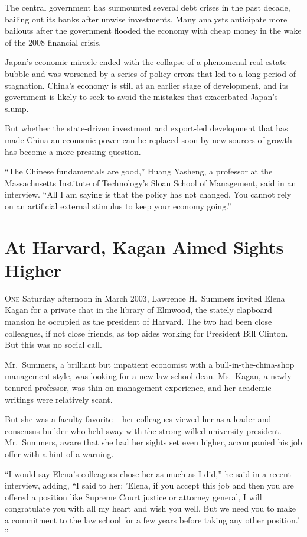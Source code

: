 ﻿\documentclass[12pt]{article}
\begin{document}
The central government has surmounted several debt crises in the past decade, bailing out its banks
after unwise investments. Many analysts anticipate more bailouts after the government flooded the
economy with cheap money in the wake of the 2008 financial crisis.

Japan's economic miracle ended with the collapse of a phenomenal real-estate bubble and was worsened
by a series of policy errors that led to a long period of stagnation. China's economy is still at an
earlier stage of development, and its government is likely to seek to avoid the mistakes that
exacerbated Japan's slump.

But whether the state-driven investment and export-led development that has made China an economic
power can be replaced soon by new sources of growth has become a more pressing question.

``The Chinese fundamentals are good,'' Huang Yasheng, a professor at the Massachusetts Institute of
Technology's Sloan School of Management, said in an interview. ``All I am saying is that the policy
has not changed. You cannot rely on an artificial external stimulus to keep your economy going.''

\section{At Harvard, Kagan Aimed Sights Higher}

\lettrine{O}{ne} Saturday afternoon in March 2003, Lawrence H.~Summers
invited Elena Kagan for a private chat in the library of Elmwood, the stately clapboard mansion he
occupied as the president of Harvard. The two had been close colleagues, if not close friends, as
top aides working for President Bill Clinton. But this was no social call.

Mr.~Summers, a brilliant but impatient economist with a bull-in-the-china-shop management style, was
looking for a new law school dean. Ms.~Kagan, a newly tenured professor, was thin on management
experience, and her academic writings were relatively scant.

But she was a faculty favorite -- her colleagues viewed her as a leader and consensus builder who
held sway with the strong-willed university president. Mr.~Summers, aware that she had her sights
set even higher, accompanied his job offer with a hint of a warning.

``I would say Elena's colleagues chose her as much as I did,'' he said in a recent interview,
adding, ``I said to her: 'Elena, if you accept this job and then you are offered a position like
Supreme Court justice or attorney general, I will congratulate you with all my heart and wish you
well. But we need you to make a commitment to the law school for a few years before taking any other
position.' ''
\end{document}
